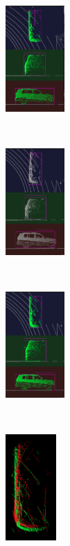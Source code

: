 \documentclass[letterpaper, 10 pt, conference]{ieeeconf}  %
\begin{document}
\begin{figure}[ht]
	\centering
	\begin{subfigure}[t]{0.18\linewidth}
		\includegraphics[height=4cm]{./figures/reg-ref-3d}\\
		\caption{}\label{fig:box-ref}
	\end{subfigure}\hfill
	~
	\begin{subfigure}[t]{0.18\linewidth}
		\includegraphics[height=4cm]{./figures/reg-input-3d}\\
		\caption{}\label{fig:box-source}
	\end{subfigure}\hfill
	~
	\begin{subfigure}[t]{0.18\linewidth}
		\includegraphics[height=4cm]{./figures/reg-result-3d}\\
		\caption{}\label{fig:box-output}
	\end{subfigure}\hfill
	~
	\begin{subfigure}[t]{0.18\linewidth}
		\includegraphics[height=4cm]{./figures/reg-input}\\

\end{subfigure}
\end{figure}
\end{document}
